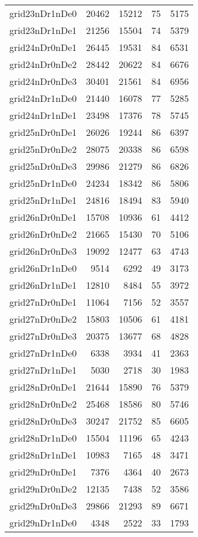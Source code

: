 \begin{longtable}{lrrrr}
grid23nDr1nDe0 & 20462 & 15212 & 75 & 5175 \\
grid23nDr1nDe1 & 21256 & 15504 & 74 & 5379 \\
grid24nDr0nDe1 & 26445 & 19531 & 84 & 6531 \\
grid24nDr0nDe2 & 28442 & 20622 & 84 & 6676 \\
grid24nDr0nDe3 & 30401 & 21561 & 84 & 6956 \\
grid24nDr1nDe0 & 21440 & 16078 & 77 & 5285 \\
grid24nDr1nDe1 & 23498 & 17376 & 78 & 5745 \\
grid25nDr0nDe1 & 26026 & 19244 & 86 & 6397 \\
grid25nDr0nDe2 & 28075 & 20338 & 86 & 6598 \\
grid25nDr0nDe3 & 29986 & 21279 & 86 & 6826 \\
grid25nDr1nDe0 & 24234 & 18342 & 86 & 5806 \\
grid25nDr1nDe1 & 24816 & 18494 & 83 & 5940 \\
grid26nDr0nDe1 & 15708 & 10936 & 61 & 4412 \\
grid26nDr0nDe2 & 21665 & 15430 & 70 & 5106 \\
grid26nDr0nDe3 & 19092 & 12477 & 63 & 4743 \\
grid26nDr1nDe0 & 9514 & 6292 & 49 & 3173 \\
grid26nDr1nDe1 & 12810 & 8484 & 55 & 3972 \\
grid27nDr0nDe1 & 11064 & 7156 & 52 & 3557 \\
grid27nDr0nDe2 & 15803 & 10506 & 61 & 4181 \\
grid27nDr0nDe3 & 20375 & 13677 & 68 & 4828 \\
grid27nDr1nDe0 & 6338 & 3934 & 41 & 2363 \\
grid27nDr1nDe1 & 5030 & 2718 & 30 & 1983 \\
grid28nDr0nDe1 & 21644 & 15890 & 76 & 5379 \\
grid28nDr0nDe2 & 25468 & 18586 & 80 & 5746 \\
grid28nDr0nDe3 & 30247 & 21752 & 85 & 6605 \\
grid28nDr1nDe0 & 15504 & 11196 & 65 & 4243 \\
grid28nDr1nDe1 & 10983 & 7165 & 48 & 3471 \\
grid29nDr0nDe1 & 7376 & 4364 & 40 & 2673 \\
grid29nDr0nDe2 & 12135 & 7438 & 52 & 3586 \\
grid29nDr0nDe3 & 29866 & 21293 & 89 & 6671 \\
grid29nDr1nDe0 & 4348 & 2522 & 33 & 1793 \\

\end{longtable}
